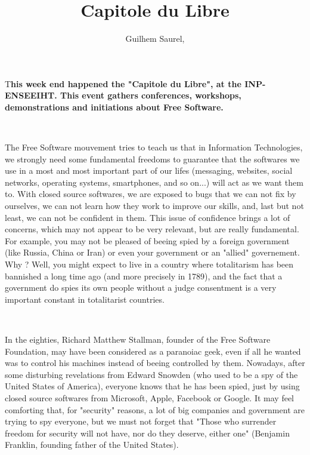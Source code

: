 \documentclass[DIV=calc, paper=a4, fontsize=11pt, twocolumn]{scrartcl} %
\title{Capitole du Libre} %
\author{Guilhem Saurel, } %
\date{} %
\newcommand{\initial}[1]{ %
    \lettrine[lines=3,lhang=0.3,nindent=0em]{
        \color{DarkGoldenrod}
{\textsf{#1}}}{}}
\begin{document}
\maketitle %

\thispagestyle{fancy} %


\initial{T}\textbf{his week end happened the "Capitole du Libre", at the INP-ENSEEIHT. This event gathers conferences, workshops, demonstrations and initiations about Free Software.}

~

The Free Software mouvement tries to teach us that in Information Technologies, we strongly need some fundamental freedoms to guarantee that the softwares we use in a most and most important part of our lifes (messaging, websites, social networks, operating systems, smartphones, and so on...) will act as we want them to. With closed source softwares, we are exposed to bugs that we can not fix by ourselves, we can not learn how they work to improve our skills, and, last but not least, we can not be confident in them.
This issue of confidence brings a lot of concerns, which may not appear to be very relevant, but are really fundamental. For example, you may not be pleased of beeing spied by a foreign government (like Russia, China or Iran) or even your government or an "allied" governement. Why ? Well, you might expect to live in a country where totalitarism has been bannished a long time ago (and more precisely in 1789), and the fact that a government do spies its own people without a judge consentment is a very important constant in totalitarist countries.

~

In the eighties, Richard Matthew Stallman, founder of the Free Software Foundation, may have been considered as a paranoiac geek, even if all he wanted was to control his machines instead of beeing controlled by them.
Nowadays, after some disturbing revelations from Edward Snowden (who used to be a spy of the United States of America), everyone knows that he has been spied, just by using closed source softwares from Microsoft, Apple, Facebook or Google.
It may feel comforting that, for "security" reasons, a lot of big companies and government are trying to spy everyone, but we must not forget that "Those who surrender freedom for security will not have, nor do they deserve, either one" (Benjamin Franklin, founding father of the United States).
\end{document}
